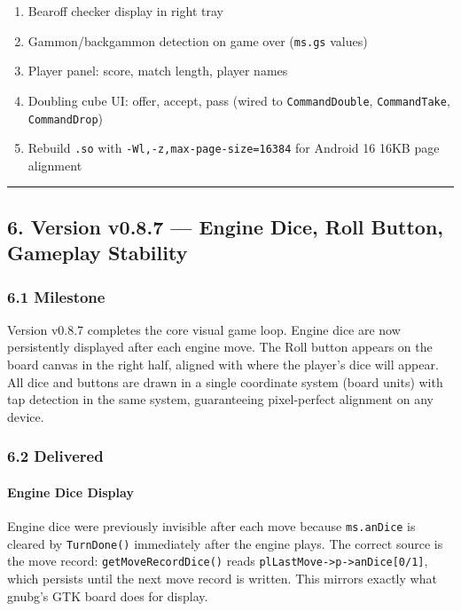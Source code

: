 \documentclass[11pt,a4paper]{article}
\providecommand{\tightlist}{\setlength{\itemsep}{2pt}\setlength{\parskip}{0pt}}
\begin{document}
\begin{enumerate}
\def\labelenumi{\arabic{enumi}.}
\tightlist
\item
  Bearoff checker display in right tray
\item
  Gammon/backgammon detection on game over (\texttt{ms.gs} values)
\item
  Player panel: score, match length, player names
\item
  Doubling cube UI: offer, accept, pass (wired to \texttt{CommandDouble},
  \texttt{CommandTake}, \texttt{CommandDrop})
\item
  Rebuild \texttt{.so} with \texttt{-Wl,-z,max-page-size=16384} for
  Android 16 16KB page alignment
\end{enumerate}

\begin{center}\rule{0.5\linewidth}{0.5pt}\end{center}


\subsection{6. Version v0.8.7 --- Engine Dice, Roll Button, Gameplay Stability}\label{version-v086}

\subsubsection{6.1 Milestone}\label{milestone-v086}

Version v0.8.7 completes the core visual game loop. Engine dice are now
persistently displayed after each engine move. The Roll button appears on
the board canvas in the right half, aligned with where the player's dice
will appear. All dice and buttons are drawn in a single coordinate system
(board units) with tap detection in the same system, guaranteeing
pixel-perfect alignment on any device.

\subsubsection{6.2 Delivered}\label{delivered-v086}

\paragraph{Engine Dice Display}

Engine dice were previously invisible after each move because
\texttt{ms.anDice} is cleared by \texttt{TurnDone()} immediately after
the engine plays. The correct source is the move record:
\texttt{getMoveRecordDice()} reads \texttt{plLastMove->p->anDice[0/1]},
which persists until the next move record is written. This mirrors
exactly what gnubg's GTK board does for display.
\end{document}
